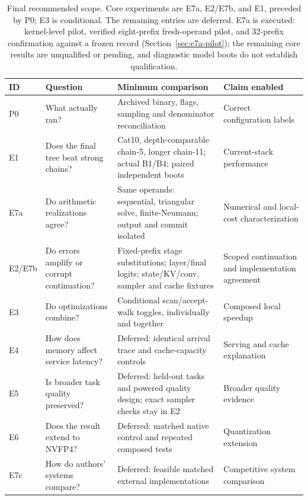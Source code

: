 \documentclass[conference]{IEEEtran}
\begin{document}
\begin{table}[t]
\caption{Final recommended scope. Core experiments are E7a, E2/E7b, and E1, preceded by P0; E3 is conditional. The remaining entries are deferred. E7a is executed: kernel-level pilot, verified eight-prefix fresh-operand pilot, and 32-prefix confirmation against a frozen record (Section~\ref{sec:e7a-pilot}); the remaining core results are unqualified or pending, and diagnostic model boots do not establish qualification.}
\label{tab:planned}
\centering\footnotesize
\begin{tabularx}{\textwidth}{@{}p{}p{}Y>{\raggedright\arraybackslash}p{0.20\textwidth}@{}}
\toprule
ID & Question & Minimum comparison & Claim enabled \\
\midrule
P0 & What actually ran? & Archived binary, flags, sampling and denominator reconciliation & Correct configuration labels \\
E1 & Does the final tree beat strong chains? & Cat10, depth-comparable chain-5, longer chain-11; actual B1/B4; paired independent boots & Current-stack performance \\
E7a & Do arithmetic realizations agree? & Same operands: sequential, triangular solve, finite-Neumann; output and commit isolated & Numerical and local-cost characterization \\
E2/E7b & Do errors amplify or corrupt continuation? & Fixed-prefix stage substitutions; layer/final logits; state/KV/conv, sampler and cache fixtures & Scoped continuation and implementation agreement \\
E3 & Do optimizations combine? & Conditional scan/accept-walk toggles, individually and together & Composed local speedup \\
E4 & How does memory affect service latency? & Deferred: identical arrival trace and cache-capacity controls & Serving and cache explanation \\
E5 & Is broader task quality preserved? & Deferred: held-out tasks and powered quality design; exact sampler checks stay in E2 & Broader quality evidence \\
E6 & Does the result extend to NVFP4? & Deferred: matched native control and repeated composed tests & Quantization extension \\
E7c & How do authors' systems compare? & Deferred: feasible matched external implementations & Competitive system comparison \\
\bottomrule
\end{tabularx}
\end{table}
\end{document}
